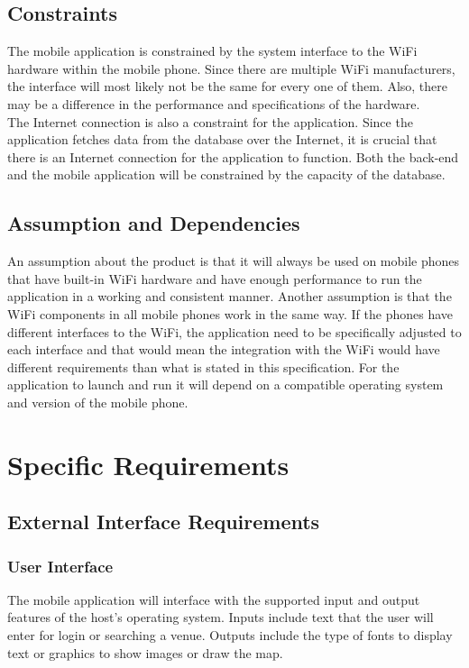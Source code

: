 \documentclass[a4paper,12pt]{article}
\begin{document}
\subsection{Constraints}
The mobile application is constrained by the system interface to the WiFi hardware within the mobile phone. Since there are multiple WiFi manufacturers, the interface will most likely not be the same for every one of them. Also, there may be a difference in the performance and specifications of the hardware. \\
The Internet connection is also a constraint for the application. Since the application fetches data from the database over the Internet, it is crucial that there is an Internet connection for the application to function. 
Both the back-end and the mobile application will be constrained by the capacity of the database. 

\subsection{Assumption and Dependencies}
An assumption about the product is that it will always be used on mobile phones that have built-in WiFi hardware and have enough performance to run the application in a working and consistent manner.
Another assumption is that the WiFi components in all mobile phones work in the same way. If the phones have different interfaces to the WiFi, the application need to be specifically adjusted to each interface and that would mean the integration with the WiFi would have different requirements than what is stated in this specification. 
For the application to launch and run it will depend on a compatible operating system and version of the mobile phone.

\section{Specific Requirements}
\subsection{External Interface Requirements}
\subsubsection{User Interface}
The mobile application will interface with the supported input and output features of the host's operating system. Inputs include text that the user will enter for login or searching a venue. Outputs include the type of fonts to display text or graphics to show images or draw the map.
\end{document}

